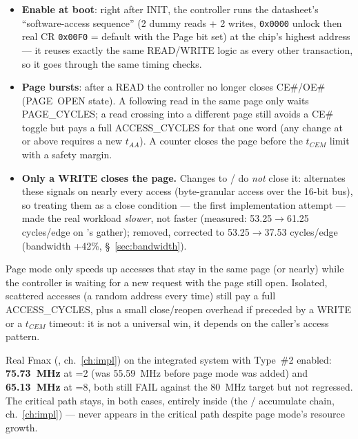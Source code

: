 \begin{itemize}
\item \textbf{Enable at boot}: right after INIT, the controller runs the
  datasheet's ``software-access sequence'' (2 dummy reads + 2 writes, \texttt{0x0000}
  unlock then real CR \texttt{0x00F0} = default with the Page bit set) at the
  chip's highest address --- it reuses exactly the same READ/WRITE logic as every
  other transaction, so it goes through the same timing checks.
\item \textbf{Page bursts}: after a READ the controller no longer closes CE\#/OE\#
  (PAGE~OPEN state). A following read in the same page only waits PAGE\_CYCLES; a
  read crossing into a different page still avoids a CE\# toggle but pays a full
  ACCESS\_CYCLES for that one word (any change at  or above requires a
  new $t_{AA}$). A counter closes the page before the $t_{CEM}$ limit with a
  safety margin.
\item \textbf{Only a WRITE closes the page.} Changes to /
  do \emph{not} close it:  alternates these signals on
  nearly every access (byte-granular access over the 16-bit bus), so treating them
  as a close condition --- the first implementation attempt --- made the real
  workload \emph{slower}, not faster (measured: 53.25$\to$61.25 cycles/edge on
  's gather); removed, corrected to 53.25$\to$37.53
  cycles/edge (bandwidth +42\%, \S~\ref{sec:bandwidth}).
\end{itemize}

\begin{fnwarn}
Page mode only speeds up accesses that stay in the same page (or nearly) while the
controller is waiting for a new request with the page still open. Isolated,
scattered accesses (a random address every time) still pay a full ACCESS\_CYCLES,
plus a small close/reopen overhead if preceded by a WRITE or a $t_{CEM}$ timeout:
it is not a universal win, it depends on the caller's access pattern.
\end{fnwarn}

Real Fmax (, ch.~\ref{ch:impl}) on the integrated
 system with Type~\#2 enabled: \textbf{75.73~MHz} at
=2 (was 55.59~MHz before page mode was added) and
\textbf{65.13~MHz} at =8, both still FAIL against the 80~MHz
target but not regressed. The critical path stays, in both cases, entirely
inside  (the /
accumulate chain, ch.~\ref{ch:impl}) ---  never appears
in the critical path despite page mode's resource growth.

